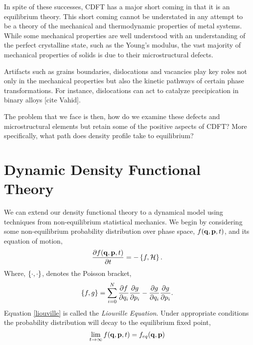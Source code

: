In spite of these successes, CDFT has a major short coming in that it is an
equilibrium theory. This short coming cannot be understated in any attempt to
be a theory of the mechanical and thermodynamic properties of metal systems.
While some mechanical properties are well understood with an understanding of
the perfect crystalline state, such as the Young's modulus, the vast majority
of mechanical properties of solids is due to their microstructural defects.

Artifacts such as grains boundaries, dislocations and vacancies play key roles
not only in the mechanical properties but also the kinetic pathways of certain
phase transformations. For instance, dislocations can act to catalyze
precipication in binary alloys [cite Vahid].

The problem that we face is then, how do we examine these defects and
microstructural elements but retain some of the positive aspects of CDFT? More
specifically, what path does density profile take to equilibrium?

\section{Dynamic Density Functional Theory} %

We can extend our density functional theory to a dynamical model using
techniques from non-equilibrium statistical mechanics. We begin by considering
some non-equilibrium probability distribution over phase space, $f(\mathbf{q}, \mathbf{p}, t)$,
and its equation of motion,
%
\begin{equation}
    \label{liouville}
    \frac{\partial f(\mathbf{q}, \mathbf{p}, t)}{\partial t} = -\left\lbrace f, \mathcal{H} \right\rbrace.
\end{equation}
%
Where, $\left\lbrace \cdot, \cdot \right\rbrace$, denotes the Poisson bracket,
%
\begin{equation}
    \left\lbrace f, g \right\rbrace = \sum_{i = 0}^N \frac{\partial f}{\partial q_i}
        \frac{\partial g}{\partial p_i} - \frac{\partial g}{\partial q_i}
        \frac{\partial g}{\partial p_i}.
\end{equation}
%
Equation \ref{liouville} is called the \textit{Liouville Equation}. Under
appropriate conditions the probability distribution will decay to the
equilibrium fixed point,
%
\begin{equation}
    \lim_{t \rightarrow \infty} f(\mathbf{q}, \mathbf{p}, t) = f_{eq}(\mathbf{q}, \mathbf{p})
\end{equation}
%

